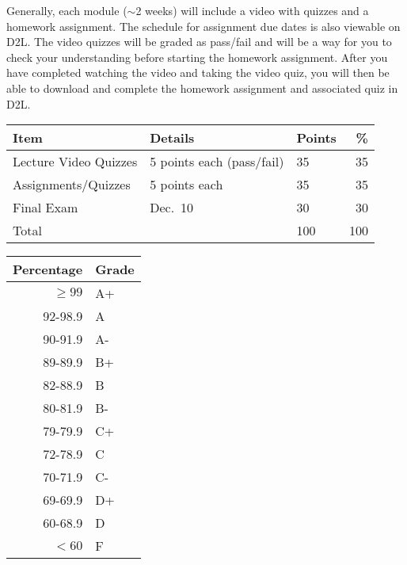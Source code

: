 \documentclass{tufte-handout}
\begin{document}
Generally, each module ($\sim$2 weeks) will include a video with quizzes and a homework assignment.  The schedule for assignment due dates is also viewable on D2L. The video quizzes will be graded as pass/fail and will be a way for you to check your understanding before starting the homework assignment. After you have completed watching the video and taking the video quiz, you will then be able to download and complete the homework assignment and associated quiz in D2L. 



\begin{table}
\begin{tabular}{l l l r}
Item & Details & Points &  \% \\
\hline
Lecture Video Quizzes & 5 points each (pass/fail) & 35 & 35 \\
Assignments/Quizzes  &  5 points each & 35 & 35\\
Final Exam & Dec.\ 10 & 30 & 30 \\
\hline
Total & & 100 & 100 
\end{tabular}
\end{table}













\begin{margintable}
\begin{tabular}{rl}
Percentage & Grade \\
\hline 
$\ge99$ & A+ \\
92-98.9 & A \\
90-91.9 & A- \\
89-89.9 & B+ \\
82-88.9 & B \\
80-81.9 & B- \\
79-79.9 & C+ \\
72-78.9 & C \\
70-71.9 & C- \\
69-69.9 & D+ \\
60-68.9 & D \\
$<60$ & F \\
\hline
\end{tabular}
\end{margintable}
\end{document}
